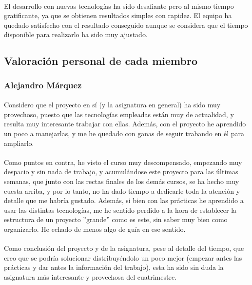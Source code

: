 \documentclass[a4paper]{article}
\begin{document}
		\paragraph{} El desarrollo con nuevas tecnologías ha sido desafiante pero al mismo tiempo gratificante, ya que se obtienen resultados simples con rapidez. El equipo ha quedado satisfecho con el resultado conseguido aunque se considera que el tiempo disponible para realizarlo ha sido muy ajustado.
		
	\subsection{Valoración personal de cada miembro}
	
	
		\subsubsection{Alejandro Márquez}
		
			\paragraph{}Considero que el proyecto en sí (y la asignatura en general) ha sido muy provechoso, puesto que las tecnologías empleadas están muy de actualidad, y resulta muy interesante trabajar con ellas. Además, con el proyecto he aprendido un poco a manejarlas, y me he quedado con ganas de seguir trabando en él para ampliarlo.

			\paragraph{}Como puntos en contra, he visto el curso muy descompensado, empezando muy despacio y sin nada de trabajo, y acumulándose este proyecto para las últimas semanas, que junto con las rectas finales de los demás cursos, se ha hecho muy cuesta arriba, y por lo tanto, no ha dado tiempo a dedicarle toda la atención y detalle que me habría gustado. Además, si bien con las prácticas he aprendido a usar las distintas tecnologías, me he sentido perdido a la hora de establecer la estructura de un proyecto ''grande'' como es este, sin saber muy bien como organizarlo. He echado de menos algo de guía en ese sentido.

			\paragraph{}Como conclusión del proyecto y de la asignatura, pese al detalle del tiempo, que creo que se podría solucionar distribuyéndolo un poco mejor (empezar antes las prácticas y dar antes la información del trabajo), esta ha sido sin duda la asignatura más interesante y provechosa del cuatrimestre.
		
\end{document}
